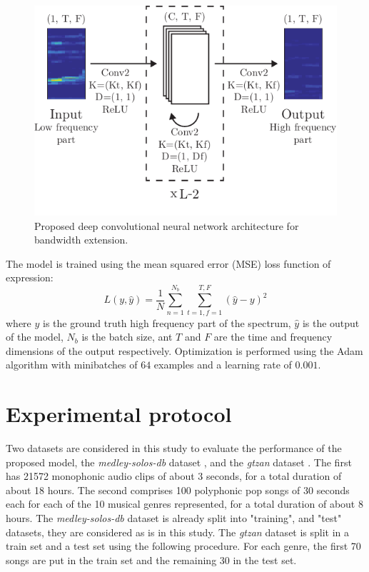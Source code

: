 \documentclass{article}
\begin{document}
\begin{figure}[t]
    \centering
    \includegraphics[width=\columnwidth]{figures/mdl.pdf}
    \caption{Proposed deep convolutional neural network architecture for bandwidth extension.}\label{fig:mdl}
    \vspace{-2mm}
\end{figure}

The model is trained using the mean squared error (MSE) loss function of expression:
\begin{equation}
L(y, \hat y) = \frac{1}{N}\sum\limits_{n=1}^{N_b}\sum\limits_{t=1, f=1}^{T, F}(\hat y - y)^2
\end{equation}
where $y$ is the ground truth high frequency part of the spectrum, $\hat y$ is the output of the model, $N_b$ is the batch size, ant $T$ and $F$ are the time and frequency dimensions of the output respectively. Optimization is performed using the Adam \cite{kingma2014adam} algorithm with minibatches of $64$ examples and a learning rate of $0.001$.


\section{Experimental protocol}
\label{sec:protocol}

Two datasets are considered in this study to evaluate the performance of the proposed model, the \textit{medley-solos-db} dataset \cite{lostanlen2016deep}, and the \textit{gtzan} dataset \cite{tzanetakis2002musical}. The first has 21572 monophonic audio clips of about 3 seconds, for a total duration of about 18 hours. The second comprises 100 polyphonic pop songs of 30 seconds each for each of the 10 musical genres represented, for a total duration of about 8 hours. The \textit{medley-solos-db} dataset is already split into "training", and "test" datasets, they are considered as is in this study. The \textit{gtzan} dataset is split in a train set and a test set using the following procedure. For each genre, the first 70 songs are put in the train set and the remaining 30 in the test set.
\end{document}

